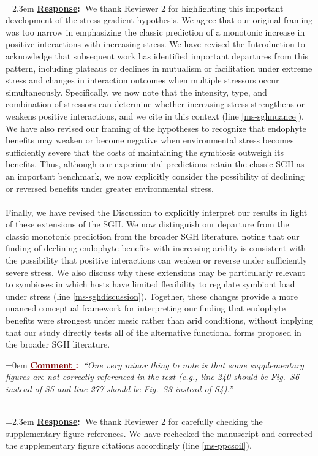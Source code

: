 \documentclass[12pt]{article}
\newcounter{cN}
\newcommand{\comment}[1]{
	\vspace{2em}
	\refstepcounter{cN} %
	\noindent \hangindent=0em \textbf{\textcolor{Maroon}{\uline{Comment \thecN}:~}}\emph{``#1''}
	}
\newcommand{\response}[1]{
	\\[0.25em]
	\hangindent=2.3em \textbf{\textcolor{NavyBlue}{\uline{Response}:~}}#1
	}
\providecommand{\uline}[1]{\underline{#1}}
\begin{document}
\response{We thank Reviewer 2 for highlighting this important development of the stress-gradient hypothesis. We agree that our original framing was too narrow in emphasizing the classic prediction of a monotonic increase in positive interactions with increasing stress. We have revised the Introduction to acknowledge that subsequent work has identified important departures from this pattern, including plateaus or declines in mutualism or facilitation under extreme stress and changes in interaction outcomes when multiple stressors occur simultaneously. Specifically, we now note that the intensity, type, and combination of stressors can determine whether increasing stress strengthens or weakens positive interactions, and we cite \cite{michalet2007highlighting,kawai2007testing,le2010interaction,david2018microbial} in this context (line \ref{ms-sghnuance}). We have also revised our framing of the hypotheses to recognize that endophyte benefits may weaken or become negative when environmental stress becomes sufficiently severe that the costs of maintaining the symbiosis outweigh its benefits. Thus, although our experimental predictions retain the classic SGH as an important benchmark, we now explicitly consider the possibility of declining or reversed benefits under greater environmental stress.
\\
\\
Finally, we have revised the Discussion to explicitly interpret our results in light of these extensions of the SGH. We now distinguish our departure from the classic monotonic prediction from the broader SGH literature, noting that our finding of declining endophyte benefits with increasing aridity is consistent with the possibility that positive interactions can weaken or reverse under sufficiently severe stress. We also discuss why these extensions may be particularly relevant to symbioses in which hosts have limited flexibility to regulate symbiont load under stress (line \ref{ms-sghdiscussion}). Together, these changes provide a more nuanced conceptual framework for interpreting our finding that endophyte benefits were strongest under mesic rather than arid conditions, without implying that our study directly tests all of the alternative functional forms proposed in the broader SGH literature.}

\comment{One very minor thing to note is that some supplementary figures are not correctly referenced in the text (e.g., line 240 should be Fig.\ S6 instead of S5 and line 277 should be Fig.\ S3 instead of S4).}
\response{We thank Reviewer 2 for carefully checking the supplementary figure references. We have rechecked the manuscript and corrected the supplementary figure citations accordingly (line \ref{ms-ppcsoil}).}
\end{document}
